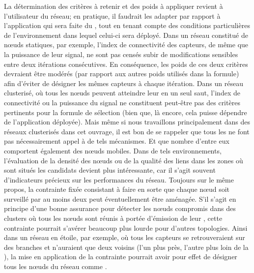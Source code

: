 La détermination des critères à retenir et des poids à appliquer revient à l'utilisateur du réseau; en pratique, il faudrait les adapter par rapport à l'application qui sera faite du \rc, tout en tenant compte des conditions particulières de l'environnement dans lequel celui-ci sera déployé.
Dans un réseau constitué de nœuds statiques, par exemple, l'index de connectivité des capteurs, de même que la puissance de leur signal, ne sont pas censés subir de modifications sensibles entre deux itérations consécutives.
En conséquence, les poids de ces deux critères devraient être modérés (par rapport aux autres poids utilisés dans la formule) afin d'éviter de désigner les mêmes capteurs à chaque itération.
Dans un réseau clusterisé, où tous les nœuds peuvent atteindre leur \CH en un seul saut, l'index de connectivité ou la puissance du signal ne constituent peut-être pas des critères pertinents pour la formule de sélection (bien que, là encore, cela puisse dépendre de l'application déployée).
Mais même si nous travaillons principalement dans des réseaux clusterisés dans cet ouvrage, il est bon de se rappeler que tous les \rcs ne font pas nécessairement appel à de tels mécanismes.
Et que nombre d'entre eux comportent également des nœuds mobiles.
Dans de tels environnements, l'évaluation de la densité des nœuds ou de la qualité des liens dans les zones où sont situés les \cns candidats devient plus intéressante, car il s'agit souvent d'indicateurs précieux sur les performances du réseau.
Toujours sur le même propos, la contrainte fixée consistant à faire en sorte que chaque nœud soit surveillé par au moins deux \cns peut éventuellement être aménagée.
S'il s'agit en principe d'une bonne assurance pour détecter les nœuds compromis dans des clusters où tous les nœuds sont réunis à portée d'émission de leur \ch, cette contrainte pourrait s'avérer beaucoup plus lourde pour d'autres topologies.
Ainsi dans un réseau en étoile, par exemple, où tous les capteurs se retrouveraient sur des branches et n'auraient que deux voisins (l'un plus près, l'autre plus loin de la \sdb), la mise en application de la contrainte pourrait avoir pour effet de désigner tous les nœuds du réseau comme \cns.
